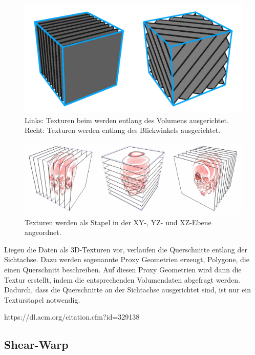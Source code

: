 \begin{figure}
	\centering
	\includegraphics[width=0.7\linewidth]{images/texture_2d3d.pdf}
	\caption{Links: Texturen beim werden entlang des Volumens ausgerichtet. Recht: Texturen werden entlang des Blickwinkels ausgerichtet.}
	\label{img:2D3DTex}
\end{figure}

\begin{figure}
	\centering
	\includegraphics[width=0.7\linewidth]{images/textureStacks.png}
	\caption{Texturen werden als Stapel in der 	XY-, YZ- und XZ-Ebene angeordnet.}
	\label{img:textureBased}
\end{figure}

Liegen die Daten als 3D-Texturen vor, verlaufen die Querschnitte entlang der Sichtachse. Dazu werden sogenannte Proxy Geometrien erzeugt, Polygone, die einen Querschnitt beschreiben. Auf diesen Proxy Geometrien wird dann die Textur erstellt, indem die entsprechenden Volumendaten abgefragt werden. Dadurch, dass die Querschnitte an der Sichtachse ausgerichtet sind, ist nur ein Texturstapel notwendig. 


https://dl.acm.org/citation.cfm?id=329138

\subsection{Shear-Warp}

